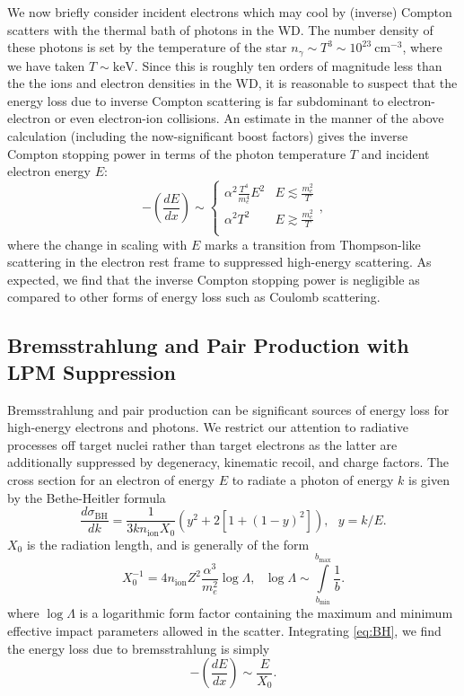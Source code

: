 \documentclass[twocolumn,showpacs,preprintnumbers,amsmath,amssymb,prd]{revtex4}
\newcommand{\cm}{\text{cm}}
\def\r{\right)}
\def\l{\left(}
\begin{document}
\begin{appendices}
We now briefly consider incident electrons which may cool by (inverse) Compton scatters with the thermal bath of photons in the WD.  
The number density of these photons is set by the temperature of the star $n_\gamma \sim T^3 \sim 10^{23} ~\cm^{-3}$, where we have taken $T \sim \text{keV}$. 
Since this is roughly ten orders of magnitude less than the the ions and electron densities in the WD, it is reasonable to suspect that the energy loss due to inverse Compton scattering is far subdominant to electron-electron or even electron-ion collisions. 
An estimate in the manner of the above calculation (including the now-significant boost factors) gives the inverse Compton stopping power in terms of the photon temperature $T$ and incident electron energy $E$:  
\begin{equation}
\label{eq:invcomptonSP}
  -\l \frac{dE}{dx}\r \sim 
  \begin{cases}
    \alpha^2 \frac{T^4}{m_e^4} E^2 & E \lesssim \frac{m_e^2}{T} \\
    \alpha^2 T^2 & E \gtrsim \frac{m_e^2}{T} \\
  \end{cases},
\end{equation}
where the change in scaling with $E$ marks a transition from Thompson-like scattering in the electron rest frame to suppressed high-energy scattering.
As expected, we find that the inverse Compton stopping power is negligible as compared to other forms of energy loss such as Coulomb scattering. 

\subsection*{Bremsstrahlung and Pair Production with LPM Suppression}
Bremsstrahlung and pair production can be significant sources of energy loss for high-energy electrons and photons. We restrict our attention to radiative processes off target nuclei rather than target electrons as the latter are additionally suppressed by degeneracy, kinematic recoil, and charge factors. 
The cross section for an electron of energy $E$ to radiate a photon of energy $k$ is given by the Bethe-Heitler formula
\begin{equation}
\label{eq:BH}
\frac{d \sigma_\text{BH}}{dk} = \frac{1}{3 k n_\text{ion} X_0} (y^2+2 [1+ (1-y)^2]), ~~~ y = k/E.
\end{equation}
$X_0$ is the radiation length, and is generally of the form
\begin{equation}
\label{eq:radiationlength}
X_0^{-1} = 4 n_\text{ion} Z^2 \frac{\alpha^3}{m_e^2} \log{\Lambda}, ~~~ \log{\Lambda} \sim \int \limits_{b_\text{min}}^{b_\text{max}} \frac{1}{b}.
\end{equation}
where $\log{\Lambda}$ is a logarithmic form factor containing the maximum and minimum effective impact parameters allowed in the scatter.
Integrating \eqref{eq:BH}, we find the energy loss due to bremsstrahlung is simply 
\begin{equation}
-\l\frac{dE}{dx}\r \sim \frac{E}{X_0}.
\end{equation}


\end{appendices}
\end{document}

